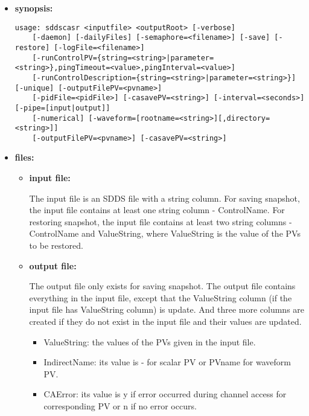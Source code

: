 \begin{itemize}
\item {\bf synopsis:} 
%
%
\begin{verbatim}
usage: sddscasr <inputfile> <outputRoot> [-verbose]
    [-daemon] [-dailyFiles] [-semaphore=<filename>] [-save] [-restore] [-logFile=<filename>]
    [-runControlPV={string=<string>|parameter=<string>},pingTimeout=<value>,pingInterval=<value>]
    [-runControlDescription={string=<string>|parameter=<string>}] [-unique] [-outputFilePV=<pvname>]
    [-pidFile=<pidFile>] [-casavePV=<string>] [-interval=<seconds>] [-pipe=[input|output]]
    [-numerical] [-waveform=[rootname=<string>][,directory=<string>]]
    [-outputFilePV=<pvname>] [-casavePV=<string>]
\end{verbatim}
\item {\bf files:}
\begin{itemize}
\item {\bf input file:} \par
The input file is an SDDS file with a string column. For saving snapshot, the input file
contains at least one string column - ControlName. For restoring snapshot, the input file
contains at least two string columns - ControlName and ValueString, where ValueString is the
value of the PVs to be restored.
\item {\bf output file:} \par
The output file only exists for saving snapshot. The output file contains everything in the input
file, except that the ValueString column (if the input file has ValueString column) is update. And
three more columns are created if they do not exist in the input file and their values are updated.
\begin{itemize}
\item {ValueString}: the values of the PVs given in the input file.
\item {IndirectName}: its value  is - for scalar PV or PVname for waveform PV.
\item {CAError}: its value is y if error occurred during channel access for
corresponding PV or n if no error occurs.
\end{itemize}
\end{itemize}


\end{itemize}
